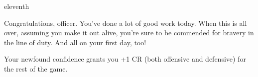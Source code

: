 \documentclass[greennotebook]{guildcamp4} %
\begin{document}
\begin{page}{eleventh}

Congratulations, officer. You've done a lot of good work today. When this is all over, assuming you make it out alive, you're sure to be commended for bravery in the line of duty. And all on your first day, too!

Your newfound confidence grants you +1 CR (both offensive and defensive) for the rest of the game.

\end{page}

\endnotebook
\end{document}
